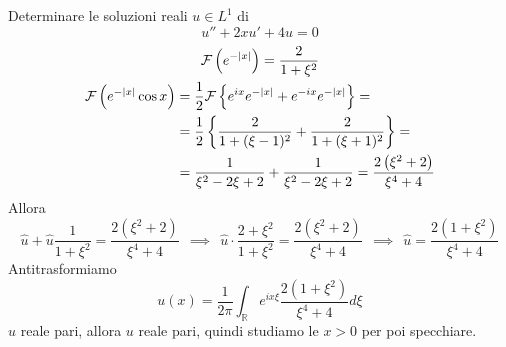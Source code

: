 Determinare le soluzioni reali $u\in L^{1}$ di
\begin{equation*}
u''+2xu'+4u=0
\end{equation*}
\ParteSoluzioni
\Soluzione
\begin{gather*}
\mathcal{F} \left( e^{-| x| }\right) =\frac{2}{1+\xi ^{2}}\\
\begin{aligned}
\mathcal{F} \left( e^{-| x| }\cos x\right) & =\frac{1}{2}\mathcal{F} \left\{e^{ix} e^{-| x| } +e^{-ix} e^{-| x| }\right\} =\\
 & =\frac{1}{2}\left\{\frac{2}{1+( \xi -1)^{2}} +\frac{2}{1+( \xi +1)^{2}}\right\} =\\
 & =\frac{1}{\xi ^{2} -2\xi +2} +\frac{1}{\xi ^{2} -2\xi +2} =\frac{2\left( \xi ^{2} +2\right)}{\xi ^{4} +4}
\end{aligned}
\end{gather*}
Allora
\begin{equation*}
\hat{u} +\hat{u}\frac{1}{1+\xi ^{2}} =\frac{2\left( \xi ^{2} +2\right)}{\xi ^{4} +4} \ \ \implies \ \ \hat{u} \cdotp \frac{2+\xi ^{2}}{1+\xi ^{2}} =\frac{2\left( \xi ^{2} +2\right)}{\xi ^{4} +4} \ \ \implies \ \ \hat{u} =\frac{2\left( 1+\xi ^{2}\right)}{\xi ^{4} +4}
\end{equation*}
Antitrasformiamo
\begin{equation*}
u( x) =\frac{1}{2\pi }\int _{\mathbb{R}} e^{ix\xi }\frac{2\left( 1+\xi ^{2}\right)}{\xi ^{4} +4} d\xi 
\end{equation*}
$\hat{u}$ reale pari, allora $u$ reale pari, quindi studiamo le $x >0$ per poi specchiare.

